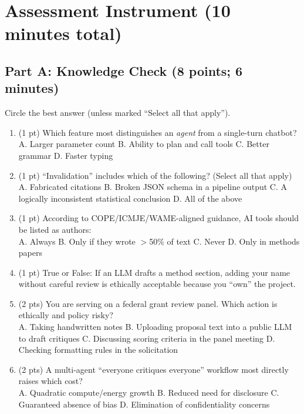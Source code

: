 \documentclass[11pt]{article}
\begin{document}
\section{Assessment Instrument (10 minutes total)}
\subsection{Part A: Knowledge Check (8 points; 6 minutes)}
Circle the best answer (unless marked ``Select all that apply'').

\begin{enumerate}[leftmargin=*]
\item (1 pt) Which feature most distinguishes an \emph{agent} from a single-turn chatbot? \\
A. Larger parameter count \quad
B. Ability to plan and call tools \quad
C. Better grammar \quad
D. Faster typing

\item (1 pt) ``Invalidation'' includes which of the following? (Select all that apply)\\
A. Fabricated citations \quad
B. Broken JSON schema in a pipeline output \quad
C. A logically inconsistent statistical conclusion \quad
D. All of the above

\item (1 pt) According to COPE/ICMJE/WAME-aligned guidance, AI tools should be listed as authors: \\
A. Always \quad
B. Only if they wrote $>$50\% of text \quad
C. Never \quad
D. Only in methods papers

\item (1 pt) True or False: If an LLM drafts a method section, adding your name without careful review is ethically acceptable because you ``own'' the project.

\item (2 pts) You are serving on a federal grant review panel. Which action is ethically and policy risky? \\
A. Taking handwritten notes \quad
B. Uploading proposal text into a public LLM to draft critiques \quad
C. Discussing scoring criteria in the panel meeting \quad
D. Checking formatting rules in the solicitation

\item (2 pts) A multi-agent ``everyone critiques everyone'' workflow most directly raises which cost? \\
A. Quadratic compute/energy growth \quad
B. Reduced need for disclosure \quad
C. Guaranteed absence of bias \quad
D. Elimination of confidentiality concerns
\end{enumerate}
\end{document}
